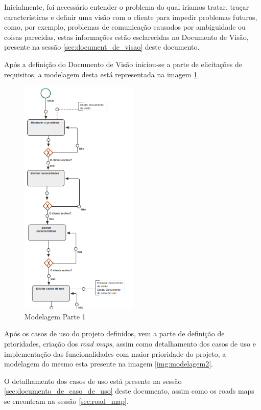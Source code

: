 
Inicialmente, foi necessário entender o problema do qual iriamos tratar, traçar características e definir uma visão com o cliente para impedir problemas futuros, como, por exemplo, problemas de comunicação causados por ambiguidade ou coisas parecidas, estas informações estão esclarecidas no Documento de Visão, presente na sessão \ref{sec:document_de_visao} deste documento.

Após a definição do Documento de Visão iniciou-se a parte de elicitações de requisitos, a modelagem desta está representada na imagem \ref{img:modelagem1}

\begin{figure}[H]
	\centering
	\includegraphics[width=0.5\textwidth]{imgModelagem/modelagem1}
	\caption{Modelagem Parte 1}
	\label{img:modelagem1}
\end{figure}

Após os casos de uso do projeto definidos, vem a parte de definição de prioridades, criação dos \textit{road maps}, assim como detalhamento dos casos de uso e implementação das funcionalidades com maior prioridade do projeto, a modelagem do mesmo esta presente na imagem \ref{img:modelagem2}.

O detalhamento dos casos de uso está presente na sessão \ref{sec:documento_de_caso_de_uso} deste documento, assim como os roads maps se encontram na sessão \ref{sec:road_map}.


